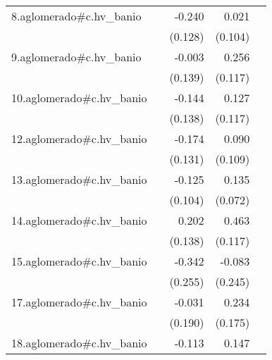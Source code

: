 {\begin{longtable}{l*{4}{D{.}{.}{-1}}}
\addlinespace
8.aglomerado#c.hv\_banio&                     &      -0.240         &       0.021         &                     \\
            &                     &     (0.128)         &     (0.104)         &                     \\
\addlinespace
9.aglomerado#c.hv\_banio&                     &      -0.003         &       0.256\sym{*}  &                     \\
            &                     &     (0.139)         &     (0.117)         &                     \\
\addlinespace
10.aglomerado#c.hv\_banio&                     &      -0.144         &       0.127         &                     \\
            &                     &     (0.138)         &     (0.117)         &                     \\
\addlinespace
12.aglomerado#c.hv\_banio&                     &      -0.174         &       0.090         &                     \\
            &                     &     (0.131)         &     (0.109)         &                     \\
\addlinespace
13.aglomerado#c.hv\_banio&                     &      -0.125         &       0.135         &                     \\
            &                     &     (0.104)         &     (0.072)         &                     \\
\addlinespace
14.aglomerado#c.hv\_banio&                     &       0.202         &       0.463\sym{***}&                     \\
            &                     &     (0.138)         &     (0.117)         &                     \\
\addlinespace
15.aglomerado#c.hv\_banio&                     &      -0.342         &      -0.083         &                     \\
            &                     &     (0.255)         &     (0.245)         &                     \\
\addlinespace
17.aglomerado#c.hv\_banio&                     &      -0.031         &       0.234         &                     \\
            &                     &     (0.190)         &     (0.175)         &                     \\
\addlinespace
18.aglomerado#c.hv\_banio&                     &      -0.113         &       0.147\sym{*}  &                     \\

\end{longtable}}
